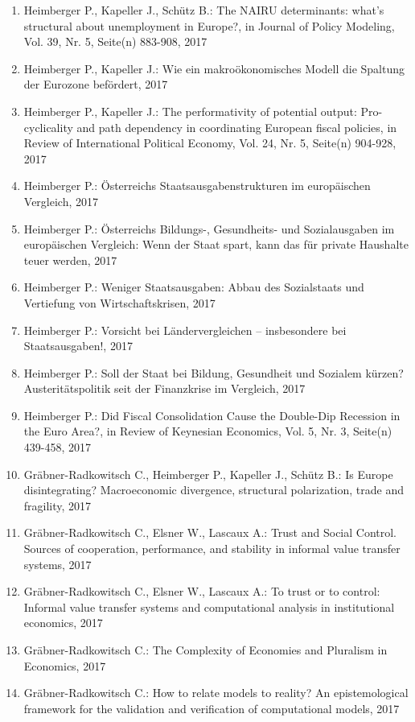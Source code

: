 \begin{enumerate}
	 \item Heimberger P., Kapeller J., Schütz B.: The NAIRU determinants: what’s structural about unemployment in Europe?, in Journal of Policy Modeling, Vol. 39, Nr. 5, Seite(n) 883-908, 2017
	 \item Heimberger P., Kapeller J.: Wie ein makroökonomisches Modell die Spaltung der Eurozone befördert, 2017
	 \item Heimberger P., Kapeller J.: The performativity of potential output: Pro-cyclicality and path dependency in coordinating European fiscal policies, in Review of International Political Economy, Vol. 24, Nr. 5, Seite(n) 904-928, 2017
	 \item Heimberger P.: Österreichs Staatsausgabenstrukturen im europäischen Vergleich, 2017
	 \item Heimberger P.: Österreichs Bildungs-, Gesundheits- und Sozialausgaben im europäischen Vergleich: Wenn der Staat spart, kann das für private Haushalte teuer werden, 2017
	 \item Heimberger P.: Weniger Staatsausgaben: Abbau des Sozialstaats und Vertiefung von Wirtschaftskrisen, 2017
	 \item Heimberger P.: Vorsicht bei Ländervergleichen – insbesondere bei Staatsausgaben!, 2017
	 \item Heimberger P.: Soll der Staat bei Bildung, Gesundheit und Sozialem kürzen? Austeritätspolitik seit der Finanzkrise im Vergleich, 2017
	 \item Heimberger P.: Did Fiscal Consolidation Cause the Double-Dip Recession in the Euro Area?, in Review of Keynesian Economics, Vol. 5, Nr. 3, Seite(n) 439-458, 2017
	 \item Gräbner-Radkowitsch C., Heimberger P., Kapeller J., Schütz B.: Is Europe disintegrating? Macroeconomic divergence, structural polarization, trade and fragility, 2017
	 \item Gräbner-Radkowitsch C., Elsner W., Lascaux A.: Trust and Social Control. Sources of cooperation, performance, and stability in informal value transfer systems, 2017
	 \item Gräbner-Radkowitsch C., Elsner W., Lascaux A.: To trust or to control: Informal value transfer systems and computational analysis in institutional economics, 2017
	 \item Gräbner-Radkowitsch C.: The Complexity of Economies and Pluralism in Economics, 2017
	 \item Gräbner-Radkowitsch C.: How to relate models to reality? An epistemological framework for the validation and verification of computational models, 2017

\end{enumerate}
